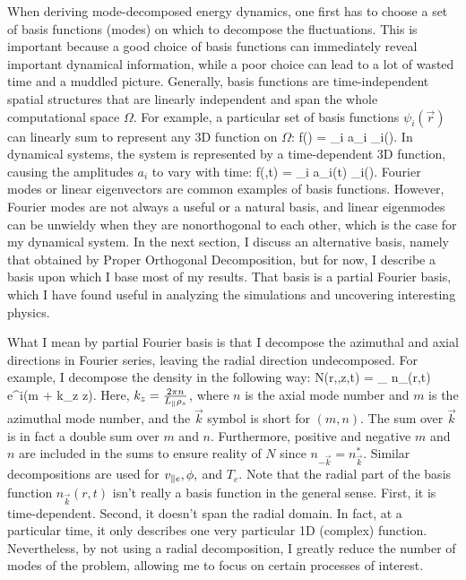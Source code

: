 When deriving mode-decomposed energy dynamics, one first has to choose a set of basis functions (modes) on which to decompose the fluctuations. This is important because a good choice
of basis functions can immediately reveal important dynamical information, while a poor choice can lead to a lot of wasted time and a muddled picture.
Generally, basis functions are time-independent spatial structures that are linearly
independent and span the whole computational space $\Omega$. For example, a particular set of basis functions $\psi_i(\vec{r})$ can linearly sum to represent any 3D function on $\Omega$:
\beq
\label{func_decomp}
f() = \sum_i a_i \psi_i().
\eeq
In dynamical systems, the system is represented by a time-dependent 3D function, causing the amplitudes $a_i$ to vary with time:
\beq
\label{func_decomp_time}
f(,t) = \sum_i a_i(t) \psi_i().
\eeq
Fourier modes or linear eigenvectors are common examples of basis functions. However, Fourier modes are not always a useful or a natural basis, 
and linear eigenmodes can be unwieldy when they are nonorthogonal to each other, which is the case for my dynamical system. In the next section, I discuss an alternative basis, 
namely that obtained by Proper Orthogonal Decomposition, but for now, I describe a basis upon which I base most of my results. That basis is a partial Fourier basis, which I have found useful 
in analyzing the simulations and uncovering interesting physics.

What I mean by partial Fourier basis is that I decompose the azimuthal and axial directions in Fourier series, leaving the radial direction undecomposed.
For example, I decompose the density in the following way:
\beq
\label{density_decomp}
N(r,\theta,z,t) = \sum_{} n_{}(r,t) e^{i(m \theta + k_z z)}.
\eeq
Here, $k_z = \frac{2 \pi n}{L_\parallel \rho_s}$, where $n$ is the axial mode number and $m$ is the azimuthal mode number, and the $\vec{k}$ symbol is short for $(m,n)$.
The sum over $\vec{k}$ is in fact a double sum over $m$ and $n$. Furthermore, positive and negative
$m$ and $n$ are included in the sums to ensure reality of $N$ since $n_{-\vec{k}} = n_{\vec{k}}^*$.
Similar decompositions are used for $v_{\parallel e}, \phi,$ and $T_e$. Note that the radial part of the basis function $n_{\vec{k}}(r,t)$ isn't really a basis function in the general sense. First,
it is time-dependent. Second, it doesn't span the radial domain. In fact, at a particular time, it only describes one very particular 1D (complex) function. Nevertheless, by not using a 
radial decomposition, I greatly reduce the number of modes of the problem, allowing me to focus on certain processes of interest.

